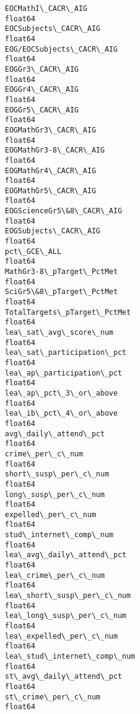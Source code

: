 \documentclass[11pt]{article}
\begin{document}
\begin{Verbatim}[commandchars=\\\{\}]
EOCMathI\_CACR\_AIG                                               float64
EOCSubjects\_CACR\_AIG                                            float64
EOG/EOCSubjects\_CACR\_AIG                                        float64
EOGGr3\_CACR\_AIG                                                 float64
EOGGr4\_CACR\_AIG                                                 float64
EOGGr5\_CACR\_AIG                                                 float64
EOGMathGr3\_CACR\_AIG                                             float64
EOGMathGr3-8\_CACR\_AIG                                           float64
EOGMathGr4\_CACR\_AIG                                             float64
EOGMathGr5\_CACR\_AIG                                             float64
EOGScienceGr5\&8\_CACR\_AIG                                        float64
EOGSubjects\_CACR\_AIG                                            float64
pct\_GCE\_ALL                                                     float64
MathGr3-8\_pTarget\_PctMet                                        float64
SciGr5\&8\_pTarget\_PctMet                                         float64
TotalTargets\_pTarget\_PctMet                                     float64
lea\_sat\_avg\_score\_num                                           float64
lea\_sat\_participation\_pct                                       float64
lea\_ap\_participation\_pct                                        float64
lea\_ap\_pct\_3\_or\_above                                           float64
lea\_ib\_pct\_4\_or\_above                                           float64
avg\_daily\_attend\_pct                                            float64
crime\_per\_c\_num                                                 float64
short\_susp\_per\_c\_num                                            float64
long\_susp\_per\_c\_num                                             float64
expelled\_per\_c\_num                                              float64
stud\_internet\_comp\_num                                          float64
lea\_avg\_daily\_attend\_pct                                        float64
lea\_crime\_per\_c\_num                                             float64
lea\_short\_susp\_per\_c\_num                                        float64
lea\_long\_susp\_per\_c\_num                                         float64
lea\_expelled\_per\_c\_num                                          float64
lea\_stud\_internet\_comp\_num                                      float64
st\_avg\_daily\_attend\_pct                                         float64
st\_crime\_per\_c\_num                                              float64

\end{Verbatim}
\end{document}
